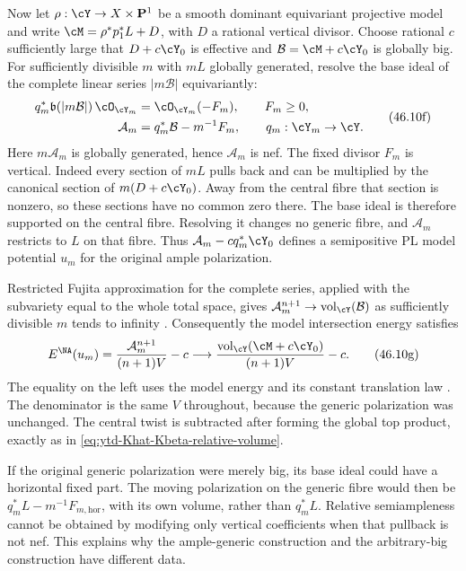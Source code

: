 Now let $\rho:\cY\to X\times\mathbf P^1$ be a smooth dominant
equivariant projective model and write
$\cM=\rho^*p_1^*L+D$, with $D$ a rational vertical divisor.
Choose rational $c$ sufficiently large that
$D+c\cY_0$ is effective and $\mathcal B=\cM+c\cY_0$ is globally big.
For sufficiently divisible $m$ with $mL$ globally generated, resolve
the base ideal of the complete linear series $|m\mathcal B|$ equivariantly:
\[
 \begin{aligned}
 q_m^*\mathfrak b(|m\mathcal B|)\,\cO_{\cY_m}
      &=\cO_{\cY_m}(-F_m),\qquad F_m\geq0,\\
 \mathcal A_m&=q_m^*\mathcal B-m^{-1}F_m,\qquad q_m:\cY_m\to\cY.
 \end{aligned}
\tag{46.10f}\label{eq:ch46-vertical-moving-parts}
\]
Here $m\mathcal A_m$ is globally generated, hence $\mathcal A_m$ is nef.
The fixed divisor $F_m$ is vertical. Indeed every section of $mL$
pulls back and can be multiplied by the canonical section of
$m(D+c\cY_0)$. Away from the central fibre that section is nonzero,
so these sections have no common zero there. The base ideal is
therefore supported on the central fibre. Resolving it changes no
generic fibre, and $\mathcal A_m$ restricts to $L$ on that fibre.
Thus $\mathcal A_m-cq_m^*\cY_0$ defines a semipositive PL model potential
$u_m$ for the original ample polarization.

Restricted Fujita approximation for the complete series, applied
with the subvariety equal to the whole total space, gives
$\mathcal A_m^{n+1}\to\operatorname{vol}_{\cY}(\mathcal B)$ as sufficiently
divisible $m$ tends to infinity
\cite[Definition~2.6 and Theorem~2.13]{ELMNP08RestrictedV2}.
Consequently the model intersection energy satisfies
\[
 E^{\NA}(u_m)
   =\frac{\mathcal A_m^{n+1}}{(n+1)V}-c
   \longrightarrow
     \frac{\operatorname{vol}_{\cY}(\cM+c\cY_0)}{(n+1)V}-c.
\tag{46.10g}\label{eq:ch46-moving-part-relative-energy}
\]
The equality on the left uses the model energy and its constant
translation law \cite[Definition~7.2 and Lemma~7.3]{BHJ16UniformV3}.
The denominator is the same $V$ throughout, because the generic
polarization was unchanged. The central twist is subtracted after
forming the global top product, exactly as in
\eqref{eq:ytd-Khat-Kbeta-relative-volume}.

If the original generic polarization were merely big, its base
ideal could have a horizontal fixed part. The moving polarization
on the generic fibre would then be $q_m^*L-m^{-1}F_{m,\mathrm{hor}}$,
with its own volume, rather than $q_m^*L$. Relative semiampleness
cannot be obtained by modifying only vertical coefficients when
that pullback is not nef. This explains why the ample-generic
construction and the arbitrary-big construction have different data.

